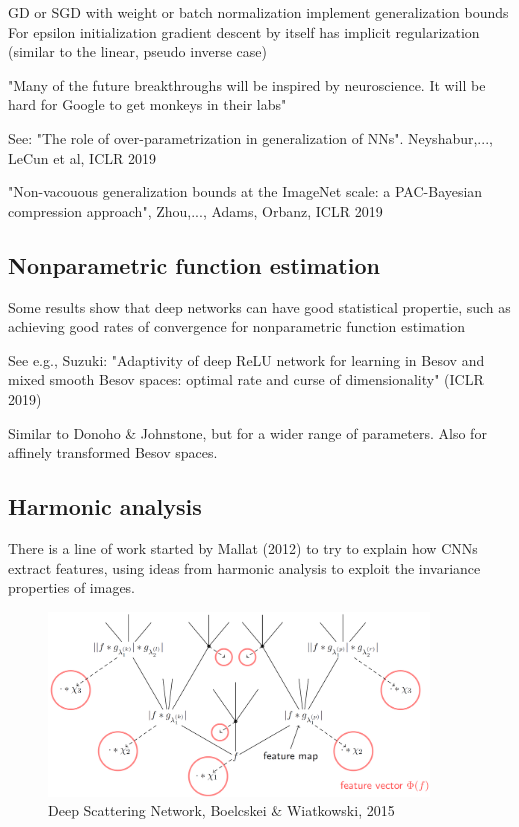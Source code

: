 \documentclass[english]{article}
\begin{document}
GD or SGD with weight or batch normalization implement generalization bounds For epsilon initialization gradient descent by itself has implicit regularization (similar to the linear, pseudo inverse case)

"Many of the future breakthroughs will be inspired by neuroscience. It will be hard for Google to get monkeys in their labs"

\eenum

\item See: "The role of over-parametrization in generalization of NNs". Neyshabur,..., LeCun et al, ICLR 2019

"Non-vacouous generalization bounds at the ImageNet scale: a PAC-Bayesian compression approach", Zhou,..., Adams, Orbanz, ICLR 2019
\eenum



\subsection{Nonparametric function estimation}


\benum
\item Some results show that deep networks can have good statistical propertie, such as achieving good rates of convergence for nonparametric function estimation

See e.g., Suzuki: "Adaptivity of deep ReLU network for learning in Besov and mixed smooth Besov spaces: optimal rate and curse of dimensionality" (ICLR 2019)

Similar to Donoho \& Johnstone, but for a wider range of parameters. Also for affinely transformed Besov spaces.

\eenum 

\subsection{Harmonic analysis}

There is a line of work started by Mallat (2012) to try to explain how CNNs extract features, using ideas from harmonic analysis to exploit the invariance properties of images. 

\begin{figure}
  \centering
  \includegraphics[width=0.9\textwidth]{s.png}
  \caption{Deep Scattering Network, Boelcskei \& Wiatkowski, 2015}
  \label{dsn}
\end{figure}
\end{document}
